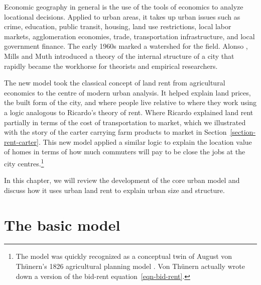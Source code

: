 Economic geography in general is the use of the tools of economics to analyze locational decisions. Applied to urban areas, it takes up urban issues such as crime, education, public transit, housing, land use restrictions, local labor markets, agglomeration economies, trade, transportation infrastructure, and local government finance. %
The early 1960s marked a watershed for the field.  Alonso \cite{alonsoModelUrbanLand1960, alonsoTheoryUrbanLand1960}, Mills \cite{millsAggregativeModelResource1967} and Muth \cite{muthCitiesHousingSpatial1969} introduced a theory of the internal structure of a city that rapidly became the workhorse for theorists and empirical researchers. 

The new model took the classical concept of land rent from agricultural economics to the centre of modern urban analysis. It helped explain land prices, the built form of the city, and where people live relative to where they work using a logic analogous to Ricardo's theory of rent. Where Ricardo explained land rent partially in terms of the cost of transportation to market, which we illustrated with the story of the carter carrying farm products to market in Section~\ref{section-rent-carter}. This new model applied a similar logic to explain the location value of homes in terms of how much commuters will pay to be close the jobs at the city centres.\footnote{The model was quickly recognized as a conceptual twin of August von Th\"unern's 1826 agricultural planning model \cite{vonthunenIsolirteStaatBeziehung1826}. Von Th\"unern actually wrote down a version of the bid-rent equation~\ref{eqn-bid-rent}.}

In this chapter, we will review the development of the core urban model and discuss how it uses urban land rent to explain urban size and structure. %


\section{The basic model}


